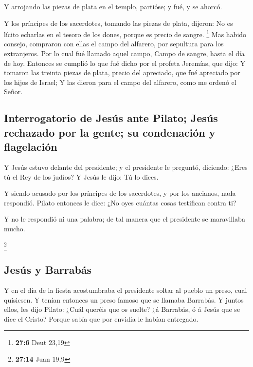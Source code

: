  Y arrojando las piezas de plata en el templo, partióse; y
fué, y se ahorcó.

 Y los príncipes de los sacerdotes, tomando las piezas de
plata, dijeron: No es lícito echarlas en el tesoro de los dones, porque
es precio de sangre. \footnote{\textbf{27:6} Deut 23,19} 
Mas habido consejo, compraron con ellas el campo del alfarero, por
sepultura para los extranjeros.  Por lo cual fué llamado
aquel campo, Campo de sangre, hasta el día de hoy. 
Entonces se cumplió lo que fué dicho por el profeta Jeremías, que dijo:
Y tomaron las treinta piezas de plata, precio del apreciado, que fué
apreciado por los hijos de Israel;  Y las dieron para el
campo del alfarero, como me ordenó el Señor.

\hypertarget{interrogatorio-de-jesuxfas-ante-pilato-jesuxfas-rechazado-por-la-gente-su-condenaciuxf3n-y-flagelaciuxf3n}{%
\subsection{Interrogatorio de Jesús ante Pilato; Jesús rechazado por la
gente; su condenación y
flagelación}\label{interrogatorio-de-jesuxfas-ante-pilato-jesuxfas-rechazado-por-la-gente-su-condenaciuxf3n-y-flagelaciuxf3n}}

 Y Jesús estuvo delante del presidente; y el presidente
le preguntó, diciendo: ¿Eres tú el Rey de los judíos? Y Jesús le dijo:
Tú lo dices.

 Y siendo acusado por los príncipes de los sacerdotes, y
por los ancianos, nada respondió.  Pilato entonces le
dice: ¿No oyes cuántas cosas testifican contra ti?

 Y no le respondió ni una palabra; de tal manera que el
presidente se maravillaba mucho.

\footnote{\textbf{27:14} Juan 19,9}

\hypertarget{jesuxfas-y-barrabuxe1s}{%
\subsection{Jesús y Barrabás}\label{jesuxfas-y-barrabuxe1s}}

 Y en el día de la fiesta acostumbraba el presidente
soltar al pueblo un preso, cual quisiesen.  Y tenían
entonces un preso famoso que se llamaba Barrabás.  Y
juntos ellos, les dijo Pilato: ¿Cuál queréis que os suelte? ¿á Barrabás,
ó á Jesús que se dice el Cristo?  Porque sabía que por
envidia le habían entregado.

